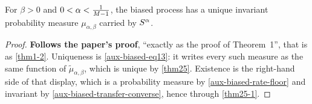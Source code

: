 \begin{theorem}
  \label{thm25-2}
  \leanok
  For $\beta > 0$ and $0 < \alpha < \tfrac{1}{M-1}$, the biased process has a unique
  invariant probability measure $\mu_{\alpha,\beta}$ carried by $S^\alpha$.
\end{theorem}
\begin{proof}
  \leanok
  \textbf{Follows the paper's proof}, ``exactly as the proof of Theorem~1'',
  that is as \ref{thm1-2}.  Uniqueness is \ref{aux-biased-eq13}: it writes every
  such measure as the same function of $\tilde{\mu}_{\alpha,\beta}$, which is
  unique by \ref{thm25}.  Existence is the right-hand side of that display,
  which is a probability measure by \ref{aux-biased-rate-floor} and invariant by
  \ref{aux-biased-transfer-converse}, hence through \ref{thm25-1}.
\end{proof}

